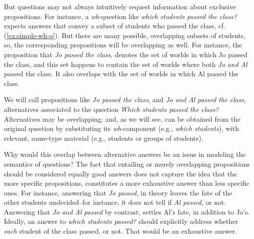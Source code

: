 But questions may not always intuitively request information about exclusive propositions. For instance, a \textit{wh}-question like \textit{which students passed the class?} expects answers that convey a subset of students who passed the class, cf. (\ref{ex:simple-wh-q}). But there are many possible, overlapping subsets of students, so, the corresponding propositions will be overlapping as well. For instance, the proposition that \textit{Jo passed the class}, denotes the set of worlds in which Jo passed the class, and this set happens to contain the set of worlds where both \textit{Jo and Al} passed the class. It also overlaps with the set of worlds in which Al passed the class. 

\begin{exe}
	\label{ex:simple-wh-q}
\end{exe} 

We will call propositions like \textit{Jo passed the class}, and \textit{Jo and Al passed the class}, alternatives associated to the question \textit{Which students passed the class?} Alternatives may be overlapping; and, as we will see, can be obtained from the original question by substituting its \textit{wh}-component (e.g., \textit{which students}), with relevant, same-type material (e.g., students or groups of students).


\begin{exe}
\end{exe}


Why would this overlap between alternative answers be an issue in modeling the semantics of questions? The fact that entailing or merely overlapping propositions should be considered equally good answers does not capture the idea that the more specific propositions, constitutes a more exhaustive answer than less specific ones. For instance, answering that \textit{Jo passed}, in theory leaves the fate of the other students undecided--for instance, it does not tell if \textit{Al passed}, or not. Answering that \textit{Jo and Al passed} by contrast, settles Al's fate, in addition to Jo's. Ideally, an answer to \textit{which students passed?} should explicitly address whether \textit{each} student of the class passed, or not. That would be an exhaustive answer.


